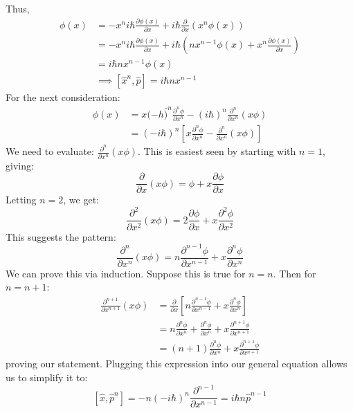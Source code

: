 \begin{sol}
\begin{enumerate}[label=\textbf{(\alph*)}]
Thus, 
\begin{align*}
[\hat{x}^n, \hat{p}]\phi(x) &= -x^ni\hbar\frac{\partial\phi(x)}{\partial x} + i\hbar\frac{\partial}{\partial x}(x^n\phi(x)) \\ &= -x^ni\hbar\frac{\partial\phi(x)}{\partial x} + i\hbar (nx^{n-1}\phi(x) + x^n\frac{\partial\phi(x)}{\partial x}) \\ &= i\hbar nx^{n-1}\phi(x) \\
&\implies [\hat{x}^n, \hat{p}] = i\hbar nx^{n-1}
\end{align*}
For the next consideration:
\begin{align*}
    [\hat{x},\hat{p}^n]\phi(x) &= x(-h\bar)^n\frac{\partial^n \phi}{\partial x^n}-(i\hbar)^n\frac{\partial^n}{\partial x^n}(x\phi) \\
    &= (-i\hbar)^n\left[x\frac{\partial^n\phi}{\partial x^n}-\frac{\partial^n}{\partial x^n}(x\phi)\right]
\end{align*}
We need to evaluate: $\displaystyle \frac{\partial^n}{\partial x^n}{(x\phi)}$. This is easiest seen by starting with $n=1$, giving:
$$\frac{\partial}{\partial x}{(x\phi)}=\phi + x\frac{\partial \phi}{\partial x}$$
Letting $n=2$, we get:
$$\frac{\partial^2}{\partial x^2}{(x\phi)}=2\frac{\partial \phi}{\partial x} + x\frac{\partial^2 \phi}{\partial x^2}$$
This suggests the pattern:
$$\frac{\partial^n}{\partial x^n}{(x\phi)}=n\frac{\partial^{n-1}\phi}{\partial x^{n-1}}+x\frac{\partial^n \phi}{\partial x^n}$$
We can prove this via induction. Suppose this is true for $n=n$. Then for $n=n+1$:
\begin{align*}
    \frac{\partial^{n+1}}{\partial x^{n+1}}{(x\phi)}&=\frac{\partial}{\partial x}\left[n\frac{\partial^{n-1}\phi}{\partial x^{n-1}}+x\frac{\partial^n \phi}{\partial x^n}\right] \\
    &= n \frac{\partial^n \phi}{\partial x^n} + \frac{\partial^n \phi}{\partial x^n} + x\frac{\partial^{n+1}\phi}{\partial x^{n+1}} \\
    &= (n+1)\frac{\partial^n \phi}{\partial x^n} + x\frac{\partial^{n+1}\phi}{\partial x^{n+1}}
\end{align*}
proving our statement. Plugging this expression into our general equation allows us to simplify it to:
$$[\hat{x},\hat{p}^n]=-n(-i\hbar)^n\frac{\partial^{n-1}}{\partial x^{n-1}} = i\hbar n\hat{p}^{n-1}$$

\end{enumerate}
\end{sol}
